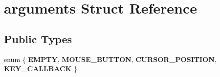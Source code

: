 \hypertarget{structarguments}{}\section{arguments Struct Reference}
\label{structarguments}
\subsection*{Public Types}
\begin{DoxyCompactItemize}
\item 
enum \{ {\bfseries E\+M\+P\+TY}, 
{\bfseries M\+O\+U\+S\+E\+\_\+\+B\+U\+T\+T\+ON}, 
{\bfseries C\+U\+R\+S\+O\+R\+\_\+\+P\+O\+S\+I\+T\+I\+ON}, 
{\bfseries K\+E\+Y\+\_\+\+C\+A\+L\+L\+B\+A\+CK}
 \}\hypertarget{structarguments_ab94edf98bcd6e3cbf6bac919112e2f8a}{}\label{structarguments_ab94edf98bcd6e3cbf6bac919112e2f8a}

\end{DoxyCompactItemize}
